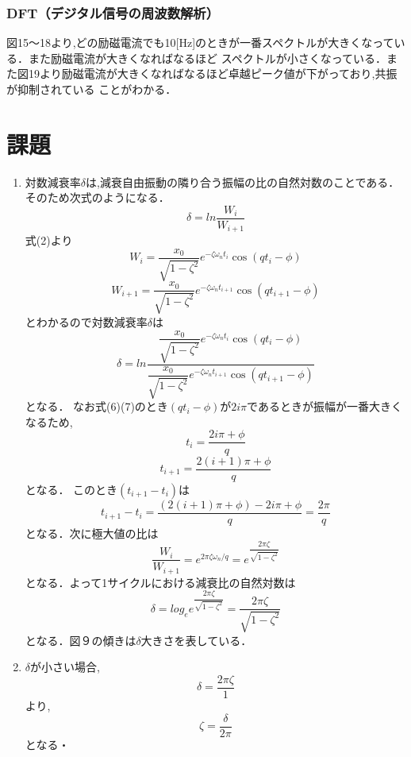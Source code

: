 \documentclass[a4paper,10.5pt]{jsarticle}
\begin{document}
\subsubsection{DFT（デジタル信号の周波数解析）}
図15〜18より,どの励磁電流でも10[Hz]のときが一番スペクトルが大きくなっている．また励磁電流が大きくなればなるほど
スペクトルが小さくなっている．また図19より励磁電流が大きくなればなるほど卓越ピーク値が下がっており,共振が抑制されている
ことがわかる．
\section{課題}
\begin{enumerate}
  \item 
対数減衰率$\delta$は,減衰自由振動の隣り合う振幅の比の自然対数のことである．そのため次式のようになる．
\begin{equation}
  \delta = {ln\dfrac{W_i}{W_{i+1}}}
\end{equation}
式(2)より
\begin{equation}
  W_i = {\dfrac{x_0}{\sqrt{1-\zeta^2}}e^{-\zeta {\omega}_{n} t_i}\cos (qt_i-\phi)}
\end{equation}
\begin{equation}
  W_{i+1} = {\dfrac{x_0}{\sqrt{1-\zeta^2}}e^{-\zeta {\omega}_{n} t_{i+1}}\cos (qt_{i+1}-\phi)}
\end{equation}
とわかるので対数減衰率$\delta$は
\begin{equation}
  \delta = ln{\dfrac{\dfrac{x_0}{\sqrt{1-\zeta^2}}e^{-\zeta {\omega}_{n} t_i}\cos (qt_i-\phi)}{\dfrac{x_0}{\sqrt{1-\zeta^2}}e^{-\zeta {\omega}_{n} t_{i+1}}\cos (qt_{i+1}-\phi)}}
\end{equation}
となる．
なお式(6)(7)のとき$(qt_{i}-\phi)$が$2i\pi$であるときが振幅が一番大きくなるため,
\begin{equation}
  t_i = {\dfrac{2i\pi+\phi}{q}}
\end{equation}
\begin{equation}
  t_{i+1} = {\dfrac{2(i+1)\pi+\phi}{q}}
\end{equation}
となる．
このとき$(t_{i+1}-t_{i})$は
\begin{equation}
  t_{i+1}-t_{i} = {\dfrac{(2(i+1)\pi+\phi)-2i\pi+\phi}{q}} = {\dfrac{2\pi}{q}}
\end{equation}
となる．次に極大値の比は
\begin{equation}
  {\dfrac{W_i}{W_{i+1}}} = e^{{2\pi\zeta\omega_n}/q} = e^{\dfrac{2\pi\zeta}{\sqrt{1-\zeta^2}}}
\end{equation}
となる．よって1サイクルにおける減衰比の自然対数は
\begin{equation}
  \delta = log_e{e^{\dfrac{2\pi\zeta}{\sqrt{1-\zeta^2}}}} = {\dfrac{2\pi\zeta}{\sqrt{1-\zeta^2}}}
\end{equation}
となる．図９の傾きは$\delta$大きさを表している．
  \item $\delta$が小さい場合,
  \begin{equation}
    \delta = {\dfrac{2\pi\zeta}{{1}}}
  \end{equation}
  より,
  \begin{equation}
    \zeta = {\dfrac{\delta}{{2\pi}}}
  \end{equation}
  となる・


\end{enumerate}
\end{document}
